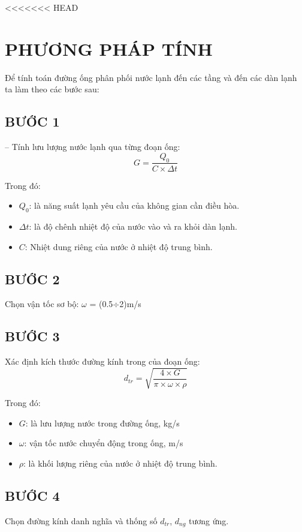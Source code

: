 <<<<<<< HEAD
\section{PHƯƠNG PHÁP TÍNH}
Để tính toán đường ống phân phối nước lạnh đến các tầng và đến các dàn lạnh ta làm theo các bước sau:
\subsection{BƯỚC 1}
-- Tính lưu lượng nước lạnh qua từng đoạn ống:
\begin{equation*}
	G = \dfrac{Q_{0}}{C\times\Delta t}
\end{equation*}

Trong đó:
\begin{itemize}
	\item $Q_{0}$: là năng suất lạnh yêu cầu của không gian cần điều hòa.
	\item $\Delta t$:  là độ chênh nhiệt độ của nước vào và ra khỏi dàn lạnh.
	\item $C$: Nhiệt dung riêng của nước ở nhiệt độ trung bình. 
\end{itemize}

\subsection{BƯỚC 2}
Chọn vận tốc sơ bộ: $\omega$ = (0.5$\div$2)m/s

\subsection{BƯỚC 3}
Xác định kích thước đường kính trong của đoạn ống:
\begin{equation*}
	d_{tr} = \sqrt{\dfrac{4\times G}{\pi\times\omega\times\rho}}
\end{equation*}

Trong đó:
\begin{itemize}
	\item $G$: là lưu lượng nước trong đường ống, kg/s
	\item $\omega$: vận tốc nước chuyển động trong ống, m/s
	\item $\rho$: là khối lượng riêng của nước ở nhiệt độ trung bình.
\end{itemize}

\subsection{BƯỚC 4}
Chọn đường kính danh nghĩa và thống số $d_{tr}$, $d_{ng}$ tương ứng.

